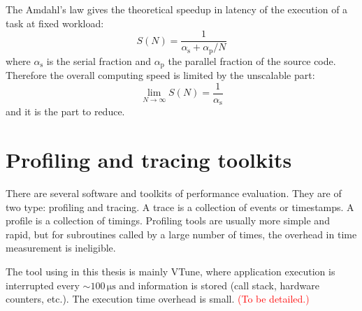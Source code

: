 The Amdahl's law gives the theoretical speedup in latency of the execution
of a task at fixed workload:
\begin{equation}
S(N)=\dfrac{1}{\alpha_{\mathrm{s}}+\alpha_{\mathrm{p}}/N}
\end{equation}
where $\alpha_{\mathrm{s}}$ is the serial fraction and $\alpha_{\mathrm{p}}$
the parallel fraction of the source code. Therefore the overall computing
speed is limited by the unscalable part:
\begin{equation}
\lim_{N\rightarrow\infty}S(N)=\frac{1}{\alpha_{\mathrm{s}}}
\end{equation}
and it is the part to reduce.


\section{Profiling and tracing toolkits}

There are several software and toolkits of performance evaluation.
They are of two type: profiling and tracing. A trace is a collection
of events or timestamps. A profile is a collection of timings. Profiling
tools are usually more simple and rapid, but for subroutines called
by a large number of times, the overhead in time measurement is ineligible. 

The tool using in this thesis is mainly VTune, where application execution
is interrupted every $\sim100\,\mathrm{\mu s}$ and information is
stored (call stack, hardware counters, etc.). The execution time overhead
is small. \textcolor{red}{(To be detailed.)}
